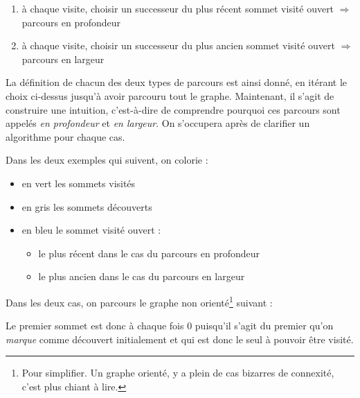 \documentclass[../../../main.tex]{subfiles}
\begin{document}
\begin{enumerate}
	\item à chaque visite, choisir un successeur du plus récent sommet visité ouvert $\Rightarrow$ parcours en profondeur
	\item à chaque visite, choisir un successeur du plus ancien sommet visité ouvert $\Rightarrow$ parcours en largeur
\end{enumerate}
La définition de chacun des deux types de parcours est ainsi donné, en itérant le choix ci-dessus jusqu'à avoir parcouru tout le graphe. Maintenant, il s'agit de construire une intuition, c'est-à-dire de comprendre pourquoi ces parcours sont appelés \textit{en profondeur} et \textit{en largeur}. On s'occupera après de clarifier un algorithme pour chaque cas.

Dans les deux exemples qui suivent, on colorie :
\begin{itemize}
	\item en vert les sommets visités
	\item en gris les sommets découverts
	\item en bleu le sommet visité ouvert :
	\begin{itemize}
		\item le plus récent dans le cas du parcours en profondeur
		\item le plus ancien dans le cas du parcours en largeur
	\end{itemize}
\end{itemize}
Dans les deux cas, on parcours le graphe non orienté\footnote{Pour simplifier. Un graphe orienté, y a plein de cas bizarres de connexité, c'est plus chiant à lire.} suivant :
\begin{center}
	\end{center}
Le premier sommet est donc à chaque fois $0$ puisqu'il s'agit du premier qu'on \textit{marque} comme découvert initialement et qui est donc le seul à pouvoir être visité.
\end{document}
